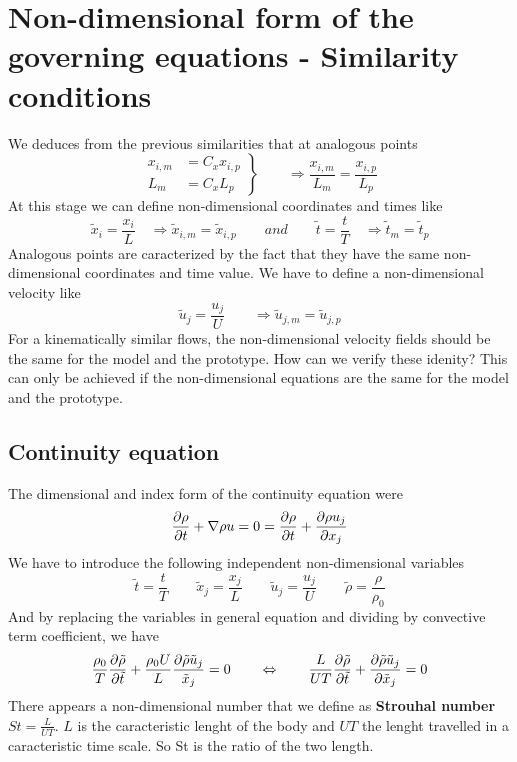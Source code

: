 \section{Non-dimensional form of the governing equations - Similarity conditions}
	We deduces from the previous similarities that at analogous points
	\begin{equation}
	\left.
	\begin{aligned}
	x_{i,m} &= C_x x_{i,p}\\
	L_m &= C_x L_p
	\end{aligned}
	\right\}
	\qquad \Rightarrow \frac{x_{i,m}}{L_m} = \frac{x_{i,p}}{L_p}
	\end{equation}
	At this stage we can define non-dimensional coordinates and times like 
	\begin{equation}
		\tilde{x}_i = \frac{x_i}{L} \quad \Rightarrow \tilde{x}_{i,m} = \tilde{x}_{i,p} \qquad and \qquad \tilde{t} = \frac{t}{T} \quad \Rightarrow \tilde{t}_m = \tilde{t}_p
	\end{equation}
	Analogous points are caracterized by the fact that they have the same non-dimensional coordinates and time value. We have to define a non-dimensional velocity like 
	\begin{equation}
		\tilde{u}_j = \frac{u_j}{U} \qquad \Rightarrow \tilde{u}_{j,m} = \tilde{u}_{j,p}
	\end{equation}
	For a kinematically similar flows, the non-dimensional velocity fields should be the same for the model and the prototype. How can we verify these idenity? This can only be achieved if the non-dimensional equations are the same for the model and the prototype. 
	
	\subsection{Continuity equation}
		The dimensional and index form of the continuity equation were 
		\begin{equation}
			\frac{\partial \rho}{\partial t} + \nabla \rho u = 0 = \frac{\partial \rho}{\partial t} + \frac{\partial\rho u_j}{\partial x_j} 
		\end{equation}
		We have to introduce the following independent non-dimensional variables 
		\begin{equation}
			\tilde{t} = \frac{t}{T} \qquad \tilde{x}_j = \frac{x_j}{L} \qquad \tilde{u}_j = \frac{u_j}{U} \qquad \tilde{\rho} = \frac{\rho}{\rho _0}
		\end{equation}
		And by replacing the variables in general equation and dividing by convective term coefficient, we have
		\begin{equation}
			\frac{\rho _0}{T} \frac{\partial \tilde{\rho}}{\partial\tilde{t}} + \frac{\rho _0 U}{L} \frac{\partial \tilde{\rho}\tilde{u}_j}{\tilde{x}_j} = 0\qquad 
			\Leftrightarrow \qquad \frac{L}{UT} \frac{\partial \tilde{\rho}}{\partial\tilde{t}} + \frac{\partial \tilde{\rho}\tilde{u}_j}{\partial \tilde{x}_j} = 0
		\end{equation}
		There appears a non-dimensional number that we define as \textbf{Strouhal number} $St = \frac{L}{UT}$. $L$ is the caracteristic lenght of the body and $UT$ the lenght travelled in a caracteristic time scale. So St is the ratio of the two length.  
		
